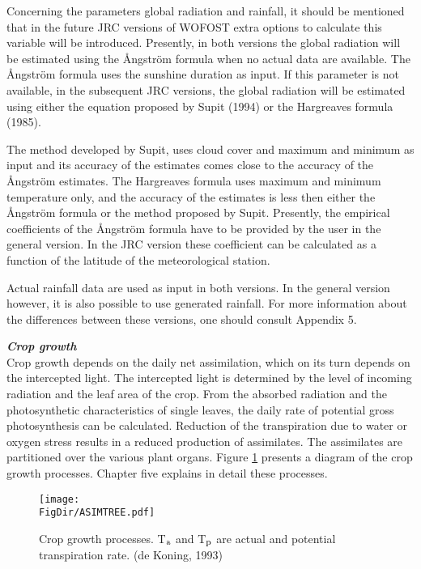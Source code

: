 Concerning the parameters global radiation and rainfall, it should be mentioned that in the
future JRC versions of WOFOST extra options to calculate this variable will be intro\-duced. 
Presently, in both versions the global radiation will be estimated using the \AA ngs\-tr\"{o}m 
formula when no actual data are available. The \AA ngs\-tr\"{o}m formula uses the sunshine
duration as input. If this parame\-ter is not available, in the subsequent JRC versions, the
global radiation will be estimated using either the equation proposed by Supit (1994) or
the Hargre\-aves formula (1985). 

The method developed by Supit, uses cloud cover and
maximum and minimum as input and its accuracy of the estimates comes close to the
accuracy of the \AA ngs\-tr\"{o}m estimates. The Hargreaves formula uses maximum and
minimum temperature only, and the accuracy of the estimates is less then either the 
\AA ngs\-tr\"{o}m formula or the method proposed by Supit.
Presently, the empirical coefficients of the \AA ngs\-tr\"{o}m formula have to be provided by the
user in the general version. In the JRC version these coefficient can be calculated as a
function of the latitude of the meteorological station.

Actual rainfall data are used as input in both versions. In the general version however, it
is also possible to use generated rainfall. For more informa\-tion about the differences
between these versions, one should consult Appendix 5.

{\bf {\it Crop growth}}\\
Crop growth depends on the daily net assimilation, which on its turn depends on the
intercepted light. The intercepted light is determined by the level of incoming radiation
and the leaf area of the crop. From the absorbed radiation and the photosynthetic
characteristics of single leaves, the daily rate of potential gross photosynthesis can be
calculated. Reduction of the transpiration due to water or oxygen stress results in a
reduced production of assimilates. The assimilates are partitioned over the various plant
organs. Figure \ref{fig:CropGrowthProcesses} presents a diagram of the crop growth processes. 
Chapter five explains in detail these processes.

\begin{figure}[htbp]
\centering
\texttt{[image: \\FigDir/ASIMTREE.pdf]}
\caption{Crop growth pro\-cesses. {\small T$_{{\rm a}}$ and T$_{{\rm p}}$ are actual and 
potential transpiration rate.} (de Koning, 1993)}
\label{fig:CropGrowthProcesses}
\end{figure}


